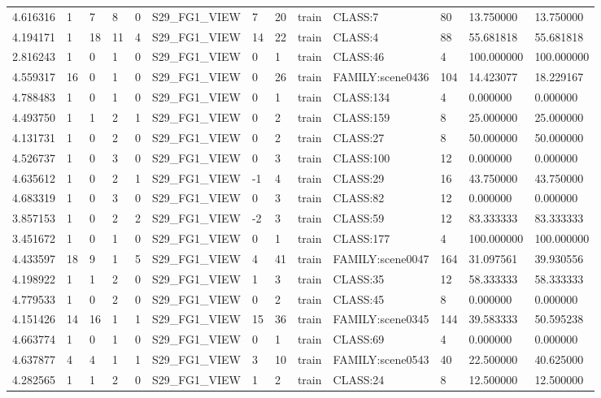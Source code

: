 \begin{tabular}{lllllllllllll}
4.616316 & 1 & 7 & 8 & 0 & S29\_FG1\_VIEW & 7 & 20 & train & CLASS:7 & 80 & 13.750000 & 13.750000 \\
4.194171 & 1 & 18 & 11 & 4 & S29\_FG1\_VIEW & 14 & 22 & train & CLASS:4 & 88 & 55.681818 & 55.681818 \\
2.816243 & 1 & 0 & 1 & 0 & S29\_FG1\_VIEW & 0 & 1 & train & CLASS:46 & 4 & 100.000000 & 100.000000 \\
4.559317 & 16 & 0 & 1 & 0 & S29\_FG1\_VIEW & 0 & 26 & train & FAMILY:scene0436 & 104 & 14.423077 & 18.229167 \\
4.788483 & 1 & 0 & 1 & 0 & S29\_FG1\_VIEW & 0 & 1 & train & CLASS:134 & 4 & 0.000000 & 0.000000 \\
4.493750 & 1 & 1 & 2 & 1 & S29\_FG1\_VIEW & 0 & 2 & train & CLASS:159 & 8 & 25.000000 & 25.000000 \\
4.131731 & 1 & 0 & 2 & 0 & S29\_FG1\_VIEW & 0 & 2 & train & CLASS:27 & 8 & 50.000000 & 50.000000 \\
4.526737 & 1 & 0 & 3 & 0 & S29\_FG1\_VIEW & 0 & 3 & train & CLASS:100 & 12 & 0.000000 & 0.000000 \\
4.635612 & 1 & 0 & 2 & 1 & S29\_FG1\_VIEW & -1 & 4 & train & CLASS:29 & 16 & 43.750000 & 43.750000 \\
4.683319 & 1 & 0 & 3 & 0 & S29\_FG1\_VIEW & 0 & 3 & train & CLASS:82 & 12 & 0.000000 & 0.000000 \\
3.857153 & 1 & 0 & 2 & 2 & S29\_FG1\_VIEW & -2 & 3 & train & CLASS:59 & 12 & 83.333333 & 83.333333 \\
3.451672 & 1 & 0 & 1 & 0 & S29\_FG1\_VIEW & 0 & 1 & train & CLASS:177 & 4 & 100.000000 & 100.000000 \\
4.433597 & 18 & 9 & 1 & 5 & S29\_FG1\_VIEW & 4 & 41 & train & FAMILY:scene0047 & 164 & 31.097561 & 39.930556 \\
4.198922 & 1 & 1 & 2 & 0 & S29\_FG1\_VIEW & 1 & 3 & train & CLASS:35 & 12 & 58.333333 & 58.333333 \\
4.779533 & 1 & 0 & 2 & 0 & S29\_FG1\_VIEW & 0 & 2 & train & CLASS:45 & 8 & 0.000000 & 0.000000 \\
4.151426 & 14 & 16 & 1 & 1 & S29\_FG1\_VIEW & 15 & 36 & train & FAMILY:scene0345 & 144 & 39.583333 & 50.595238 \\
4.663774 & 1 & 0 & 1 & 0 & S29\_FG1\_VIEW & 0 & 1 & train & CLASS:69 & 4 & 0.000000 & 0.000000 \\
4.637877 & 4 & 4 & 1 & 1 & S29\_FG1\_VIEW & 3 & 10 & train & FAMILY:scene0543 & 40 & 22.500000 & 40.625000 \\
4.282565 & 1 & 1 & 2 & 0 & S29\_FG1\_VIEW & 1 & 2 & train & CLASS:24 & 8 & 12.500000 & 12.500000 \\

\end{tabular}
